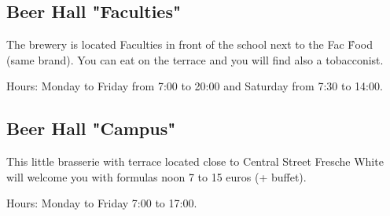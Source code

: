 
\subsection {Beer Hall "Faculties"}
The brewery is located Faculties in front of the school next to the Fac \'Food (same brand).
You can eat on the terrace and you will find also a tobacconist.

Hours: Monday to Friday from 7:00 to 20:00 and Saturday from 7:30 to 14:00.



\subsection {Beer Hall "Campus"}
This little brasserie with terrace located close to Central Street Fresche White will welcome you with formulas noon 7 to 15 euros (+ buffet).

Hours: Monday to Friday 7:00 to 17:00.


